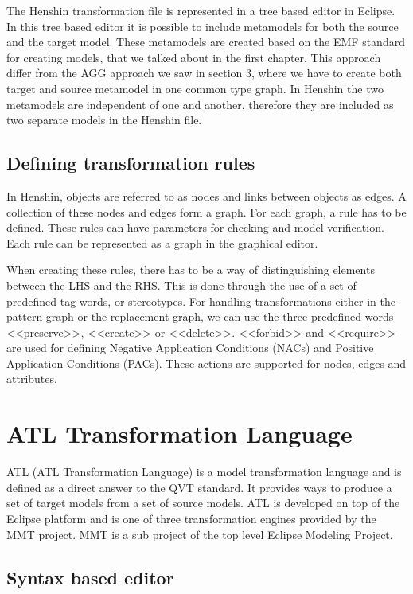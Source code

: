 \documentclass[pdftex,11pt,a4paper]{article}
\begin{document}
The Henshin transformation file is represented in a tree based editor in
Eclipse. In this tree based editor it is possible to include metamodels for both
the source and the target model. These metamodels are created based on the EMF
standard for creating models, that we talked about in the first chapter.
This approach differ from the AGG approach we saw in section 3, where we have
to create both target and source metamodel in one common type graph. In Henshin
the two metamodels are independent of one and another, therefore they are
included as two separate models in the Henshin file. 

\subsection{Defining transformation rules}

\noindent In Henshin, objects are referred to as nodes and links between objects
as edges. A collection of these nodes and edges form a graph. For each graph, a
rule has to be defined. These rules can have parameters for checking and model
verification. Each rule can be represented as a graph in the graphical
editor. 

\indent When creating these rules, there has to be a way of
distinguishing elements between the LHS and the RHS. This is done through the
use of a set of predefined tag words, or stereotypes. For handling transformations
either in the pattern graph or the replacement graph, we can use the three
predefined words <<preserve>>, <<create>> or <<delete>>. <<forbid>> and
<<require>> are used for defining Negative Application Conditions (NACs) and
Positive Application Conditions (PACs). These actions are supported for nodes,
edges and attributes. 

\section{ATL Transformation Language}

\noindent ATL\cite{ATL} (ATL Transformation Language) is a model transformation
language and is defined as a direct answer to the QVT\cite{QVT} standard. It
provides ways to produce a set of target models from a set of source models.
ATL is developed on top of the Eclipse platform and is one of three
transformation engines provided by the MMT project\cite{MMT}. MMT is a sub
project of the top level Eclipse Modeling Project\cite{EMP}.

\subsection{Syntax based editor}
\end{document}
